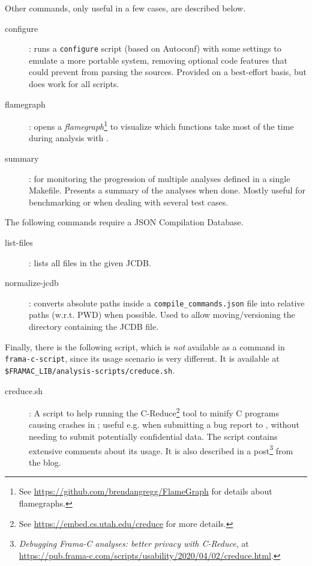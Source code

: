 Other commands, only useful in a few cases, are described below.

\begin{description}
\item[configure]: runs a \texttt{configure}
  script (based on Autoconf) with some settings to emulate a more portable
  system, removing optional code features that could prevent \FramaC from
  parsing the sources. Provided on a best-effort basis, but does work for all
  scripts.
\item[flamegraph]: opens a {\em flamegraph}\footnote{%
  See \url{https://github.com/brendangregg/FlameGraph} for details about
  flamegraphs.} to visualize which functions take most of the time
  during analysis with \Value.
\item[summary]: for monitoring the progression of multiple analyses defined
  in a single Makefile. Presents a summary of the analyses when done. Mostly
  useful for benchmarking or when dealing with several test cases.
\end{description}

The following commands require a JSON Compilation Database.

\begin{description}
\item[list-files]: lists all files in the given JCDB.
\item[normalize-jcdb]: converts absolute paths inside a
  \texttt{compile\_commands.json} file into relative paths (w.r.t. PWD)
  when possible. Used to allow moving/versioning the directory containing
  the JCDB file.
\end{description}

Finally, there is the following script, which is {\em not} available as a
command in \texttt{frama-c-script}, since its usage scenario is very
different. It is available at\\
\texttt{\$FRAMAC\_LIB/analysis-scripts/creduce.sh}.

\begin{description}
\item[creduce.sh]: A script to help running the C-Reduce\footnote{%
  See \url{https://embed.cs.utah.edu/creduce} for more details.} tool to minify
  C programs causing crashes in \FramaC; useful e.g. when submitting a bug
  report to \FramaC, without needing to submit potentially confidential data.
  The script contains extensive comments about its usage. It is also
  described in a post\footnote{%
    {\em Debugging Frama-C analyses: better privacy with C-Reduce},
    at \url{https://pub.frama-c.com/scripts/usability/2020/04/02/creduce.html}.}
  from the \FramaC blog.
\end{description}

